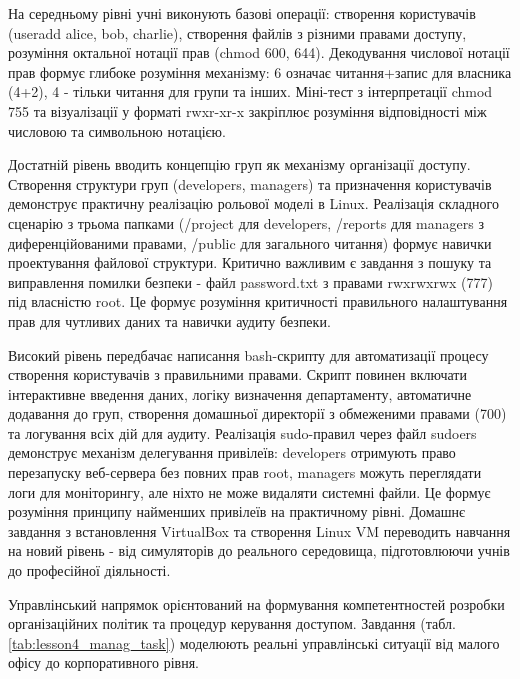 


На середньому рівні учні виконують базові операції: створення користувачів (useradd alice, bob, charlie), створення файлів з різними правами доступу, розуміння октальної нотації прав (chmod 600, 644).
Декодування числової нотації прав формує глибоке розуміння механізму: 6 означає читання+запис для власника (4+2), 4 - тільки читання для групи та інших. Міні-тест з інтерпретації chmod 755 та візуалізації у форматі rwxr-xr-x закріплює розуміння відповідності між числовою та символьною нотацією.

Достатній рівень вводить концепцію груп як механізму організації доступу. Створення структури груп (developers, managers) та призначення користувачів демонструє практичну реалізацію рольової моделі в Linux. Реалізація складного сценарію з трьома папками (/project для developers, /reports для managers з диференційованими правами, /public для загального читання) формує навички проектування файлової структури.
Критично важливим є завдання з пошуку та виправлення помилки безпеки - файл password.txt з правами rwxrwxrwx (777) під власністю root. Це формує розуміння критичності правильного налаштування прав для чутливих даних та навички аудиту безпеки.

Високий рівень передбачає написання bash-скрипту для автоматизації процесу створення користувачів з правильними правами. Скрипт повинен включати інтерактивне введення даних, логіку визначення департаменту, автоматичне додавання до груп, створення домашньої директорії з обмеженими правами (700) та логування всіх дій для аудиту.
Реалізація sudo-правил через файл sudoers демонструє механізм делегування привілеїв: developers отримують право перезапуску веб-сервера без повних прав root, managers можуть переглядати логи для моніторингу, але ніхто не може видаляти системні файли. Це формує розуміння принципу найменших привілеїв на практичному рівні.
Домашнє завдання з встановлення VirtualBox та створення Linux VM переводить навчання на новий рівень - від симуляторів до реального середовища, підготовлюючи учнів до професійної діяльності.



Управлінський напрямок орієнтований на формування компетентностей розробки організаційних політик та процедур керування доступом. Завдання (табл. \ref{tab:lesson4_manag_task}) моделюють реальні управлінські ситуації від малого офісу до корпоративного рівня.

